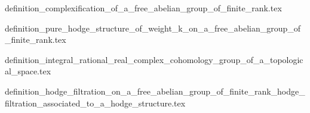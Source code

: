 
{definition_complexification_of_a_free_abelian_group_of_finite_rank.tex}


{definition_pure_hodge_structure_of_weight_k_on_a_free_abelian_group_of_finite_rank.tex}
% 

{definition_integral_rational_real_complex_cohomology_group_of_a_topological_space.tex}




{definition_hodge_filtration_on_a_free_abelian_group_of_finite_rank_hodge_filtration_associated_to_a_hodge_structure.tex}
